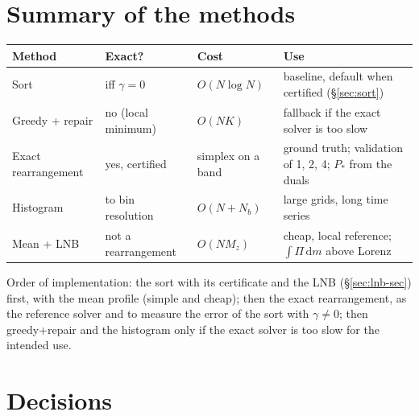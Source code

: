 \documentclass[11pt,a4paper]{article}
\begin{document}
\section{Summary of the methods}
\begin{center}\small
\begin{tabular}{p{2.8cm}p{3.2cm}p{2.3cm}p{5.8cm}}
\hline
Method & Exact? & Cost & Use \\ \hline
Sort & iff $\gamma=0$ & $O(N\log N)$ & baseline, default when certified (\S\ref{sec:sort}) \\
Greedy + repair & no (local minimum) & $O(NK)$ & fallback if the exact solver is too slow \\
Exact rearrangement & yes, certified & simplex on a band & ground truth; validation of 1, 2, 4; $P_*$ from the duals \\
Histogram & to bin resolution & $O(N+N_b)$ & large grids, long time series \\
Mean + LNB & not a rearrangement & $O(NM_z)$ & cheap, local reference; $\int\Pi\,\mathrm{d}m$ above Lorenz \\ \hline
\end{tabular}
\end{center}
Order of implementation: the sort with its certificate and the LNB (\S\ref{sec:lnb-sec}) first, with the mean profile (simple
and cheap); then the exact rearrangement, as the reference solver and to measure the error of the sort with
$\gamma\neq0$; then greedy+repair and the histogram only if the exact solver is too slow for the intended use.

\section{Decisions}\label{sec:decisions}
\end{document}
